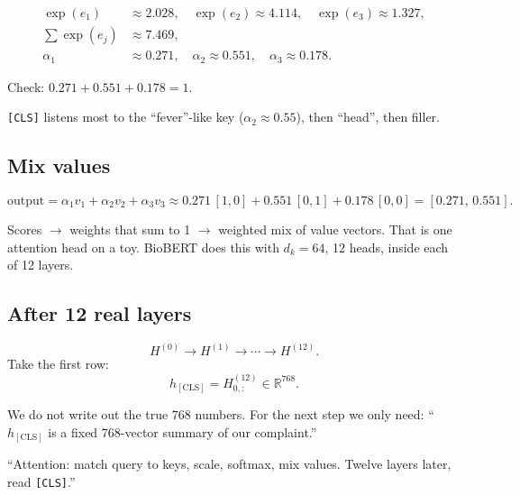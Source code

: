 \begin{align*}
  \exp(e_1) &\approx 2.028,\quad
  \exp(e_2) \approx 4.114,\quad
  \exp(e_3) \approx 1.327, \\
  \sum\exp(e_j) &\approx 7.469, \\
  \alpha_1 &\approx 0.271,\quad
  \alpha_2 \approx 0.551,\quad
  \alpha_3 \approx 0.178.
\end{align*}

Check: \(0.271+0.551+0.178 = 1\).

\texttt{[CLS]} listens most to the ``fever''-like key (\(\alpha_2\approx 0.55\)), then ``head'', then filler.

\subsection*{Mix values}

\[
  \mathrm{output}
  = \alpha_1 v_1 + \alpha_2 v_2 + \alpha_3 v_3
  \approx 0.271\,[1,0] + 0.551\,[0,1] + 0.178\,[0,0]
  = [0.271,\, 0.551].
\]

\begin{stepbox}
Scores \(\to\) weights that sum to 1 \(\to\) weighted mix of value vectors.
That is one attention head on a toy. BioBERT does this with \(d_k=64\), 12 heads, inside each of 12 layers.
\end{stepbox}

\subsection*{After 12 real layers}

\[
  H^{(0)} \to H^{(1)} \to \cdots \to H^{(12)}.
\]
Take the first row:
\[
  h_{\mathrm{[CLS]}} = H^{(12)}_{0,:} \in \mathbb{R}^{768}.
\]

\begin{notebox}
We do not write out the true \(768\) numbers. For the next step we only need:
``\(h_{\mathrm{[CLS]}}\) is a fixed 768-vector summary of our complaint.''
\end{notebox}

\begin{saybox}
``Attention: match query to keys, scale, softmax, mix values. Twelve layers later, read \texttt{[CLS]}.''
\end{saybox}
